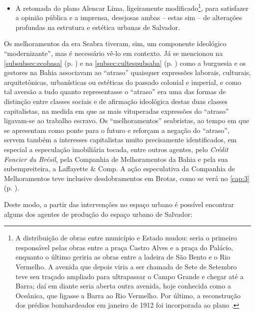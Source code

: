 \begin{itemize}
\item A retomada do plano Alencar Lima, ligeiramente modificado\footnote{A distribuição de obras entre município e Estado mudou: seria o primeiro responsável pelas obras entre a praça Castro Alves e a praça do Palácio, enquanto o último geriria as obras entre a ladeira de São Bento e o Rio Vermelho. A avenida que depois viria a ser chamada de Sete de Setembro teve seu traçado ampliado para ultrapassar o Campo Grande e chegar até a Barra; daí em diante seria aberta outra avenida, hoje conhecida como a Oceânica, que ligasse a Barra ao Rio Vermelho. Por último, a reconstrução dos prédios bombardeados em janeiro de 1912 foi incorporada ao plano \cite[p.~101]{CUNHA2011}.}, para satisfazer a opinião pública e a imprensa, desejosas ambas -- estas sim -- de alterações profundas na estrutura e estética urbanas de Salvador.
\end{itemize}

Os melhoramentos da era Seabra tiveram, sim, um componente ideológico ``modernizante'', mas é necessário vê-lo em contexto. Já se mencionou na \autoref{subsubsec:ecobasa} (p. \pageref{subsubsec:ecobasa}) e na \autoref{subsec:cultespubsaba} (p. \pageref{subsec:cultespubsaba}) como a burguesia e os gestores na Bahia associavam ao ``atraso'' quaisquer expressões laborais, culturais, arquitetônicas, urbanísticas ou estéticas do passado colonial e imperial, e como tal aversão a tudo quanto representasse o ``atraso'' era uma das formas de distinção entre classes sociais e de afirmação ideológica destas duas classes capitalistas, na medida em que as mais vituperadas expressões do ``atraso'' ligavam-se ao trabalho escravo. Os ``melhoramentos'' seabristas, ao tempo em que se apresentam como ponte para o futuro e reforçam a negação do ``atraso'', servem também a interesses capitalistas muito precisamente identificados, em especial a especulação imobiliária tocada, entre outros agentes, pelo \textit{Crédit Foncier du Brésil}, pela Companhia de Melhoramentos da Bahia e pela sua subempreiteira, a Laffayette \& Comp. A ação especulativa da Companhia de Melhoramentos teve inclusive desdobramentos em Brotas, como se verá no \autoref{cap:3} (p. \pageref{cap:3}).

Deste modo, a partir das intervenções no espaço urbano é possível encontrar alguns dos agentes de produção do espaço urbano de Salvador:

